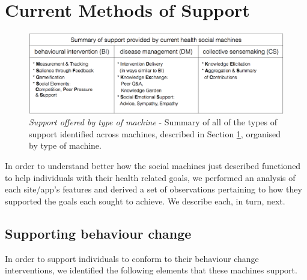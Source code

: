 \documentclass{sig-alternate}
\begin{document}
\section{Current Methods of Support}
\label{sec:support}
\begin{figure}[htb]
\begin{center}
\includegraphics[width=14cm]{img/table2-summary.png}
\caption{\emph{Support offered by type of machine} - Summary of all of
  the types of support identified across machines, described in
  Section \ref{sec:support}, organised by type of machine.} \label{fig:summaryofsupport}
\end{center}
\end{figure}


In order to understand better how the social machines just described
functioned to help individuals with their health related goals, we
performed an analysis of each site/app's features and derived a set of
observations pertaining to how they supported the goals each sought to
achieve.  We describe each, in turn, next.

\subsection{Supporting behaviour change}
\label{sec:intervention}

In order to support individuals to conform to their behaviour change
interventions, we identified the following elements that these machines
support.
\end{document}
